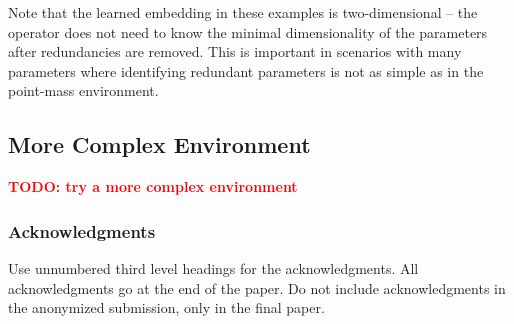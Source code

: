 \documentclass{article}
\newcommand{\TODO}[1]{\textcolor{red}{\textbf{TODO: #1}}}
\begin{document}
Note that the learned embedding in these examples is two-dimensional -- 
the operator does not need to know the minimal dimensionality of the parameters after redundancies are removed.
This is important in scenarios with many parameters where identifying redundant parameters 
is not as simple as in the point-mass environment.

\subsection{More Complex Environment}
\TODO{try a more complex environment}


\subsubsection*{Acknowledgments}

Use unnumbered third level headings for the acknowledgments. All
acknowledgments go at the end of the paper. Do not include
acknowledgments in the anonymized submission, only in the final paper.

\small

{}

\end{document}
